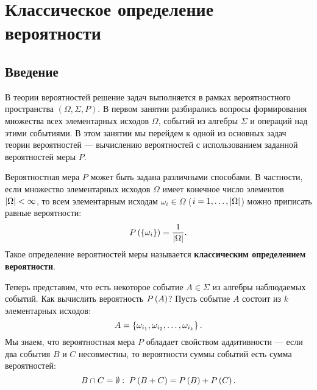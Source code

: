 \chapter{Классическое определение вероятности}

\section*{Введение}

В теории вероятностей решение задач выполняется в рамках вероятностного пространства $\left ( \Omega, \Sigma, P \right )$. В первом занятии разбирались вопросы формирования
множества всех элементарных исходов $\Omega$, событий из алгебры $\Sigma$ и операций над этими событиями. В этом занятии мы перейдем к одной из основных задач теории вероятностей
--- вычислению вероятностей с использованием заданной вероятностей меры $P$.

Вероятностная мера $P$ может быть задана различными способами. В частности, если множество элементарных исходов $\Omega$ имеет конечное число элементов $\left | \Omega \right | < \infty$,
то всем элементарным исходам $\omega_i \in \Omega$ ($i=1,\dots,\left | \Omega \right |$) можно приписать равные вероятности:
\begin{equation}
    P \left ( \left \{ \omega_i \right \} \right ) = \frac{1}{\left | \Omega \right |}.
\end{equation}
Такое определение вероятностей меры называется \textbf{классическим определением вероятности}.

Теперь представим, что есть некоторое событие $A \in \Sigma$ из алгебры наблюдаемых событий. Как вычислить вероятность $P \left ( A \right )$? Пусть событие $A$ состоит из $k$
элементарных исходов:
\begin{equation}
    A = \left \{  \omega_{i_1}, \omega_{i_2}, \dots, \omega_{i_k} \right \}.
\end{equation}
Мы знаем, что вероятностная мера $P$ обладает свойством аддитивности --- если два события $B$ и $C$ несовместны, то вероятности суммы событий есть сумма вероятностей:
\begin{equation}
    B \cap C = \emptyset : \; P \left ( B + C \right ) = P \left ( B \right ) + P \left ( C \right ).
\end{equation}

